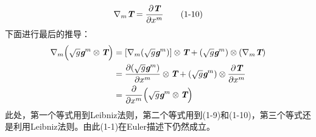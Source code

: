 \documentclass[UTF8]{ctexart}
\begin{document}
\begin{equation*}
    \nabla_m\textit{\textbf{T}} = \frac{\partial\textit{\textbf{T}} }{\partial x^m}\tag{1-10}
\end{equation*}
下面进行最后的推导：
\begin{align*}
    \nabla_m \Big(\sqrt{g}\textit{\textbf{g}}^m\otimes \textit{\textbf{T}} \Big) &=[ \nabla_m (\sqrt{g}\textit{\textbf{g}}^m)] \otimes \textit{\textbf{T}} + (\sqrt{g}\textit{\textbf{g}}^m) \otimes (\nabla_m \textit{\textbf{T}})\\
    &=\frac{\partial (\sqrt{g}\textit{\textbf{g}}^m)}{\partial x^m} \otimes \textit{\textbf{T}} + (\sqrt{g}\textit{\textbf{g}}^m) \otimes \frac{\partial\textit{\textbf{T}} }{\partial x^m}\\
    &=\frac{\partial}{\partial x^m}\Big(\sqrt{g}\textit{\textbf{g}}^m\otimes \textit{\textbf{T}} \Big) 
\end{align*}
此处，第一个等式用到Leibniz法则，第二个等式用到(1-9)和(1-10)，第三个等式还是利用Leibniz法则。由此(1-1)在Euler描述下仍然成立。
\end{document}
